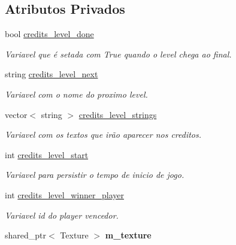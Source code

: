 \subsection*{Atributos Privados}
\begin{DoxyCompactItemize}
\item 
\mbox{\label{classCreditsLevel_a2b7dd48d2e3def60499d4f6143b61923}} 
bool \mbox{\hyperlink{classCreditsLevel_a2b7dd48d2e3def60499d4f6143b61923}{credits\+\_\+level\+\_\+done}}
\begin{DoxyCompactList}\small\item\em Variavel que é setada com True quando o level chega ao final. \end{DoxyCompactList}\item 
\mbox{\label{classCreditsLevel_a4203423c76e8ba68f943f39d2f0d05c7}} 
string \mbox{\hyperlink{classCreditsLevel_a4203423c76e8ba68f943f39d2f0d05c7}{credits\+\_\+level\+\_\+next}}
\begin{DoxyCompactList}\small\item\em Variavel com o nome do proximo level. \end{DoxyCompactList}\item 
\mbox{\label{classCreditsLevel_aff556bd002a49a803299152ad2f76262}} 
vector$<$ string $>$ \mbox{\hyperlink{classCreditsLevel_aff556bd002a49a803299152ad2f76262}{credits\+\_\+level\+\_\+strings}}
\begin{DoxyCompactList}\small\item\em Variavel com os textos que irão aparecer nos creditos. \end{DoxyCompactList}\item 
\mbox{\label{classCreditsLevel_ab7ac1647d977be5650daee20614bdede}} 
int \mbox{\hyperlink{classCreditsLevel_ab7ac1647d977be5650daee20614bdede}{credits\+\_\+level\+\_\+start}}
\begin{DoxyCompactList}\small\item\em Variavel para persistir o tempo de inicio de jogo. \end{DoxyCompactList}\item 
int \mbox{\hyperlink{classCreditsLevel_af25e3be232ccdb229faa00e7114d54e1}{credits\+\_\+level\+\_\+winner\+\_\+player}}
\begin{DoxyCompactList}\small\item\em Variavel id do player vencedor. \end{DoxyCompactList}\item 
\mbox{\label{classCreditsLevel_a27faf20ac97534bd328a2c8a017ca5ea}} 
shared\+\_\+ptr$<$ Texture $>$ {\bfseries m\+\_\+texture}
\end{DoxyCompactItemize}


